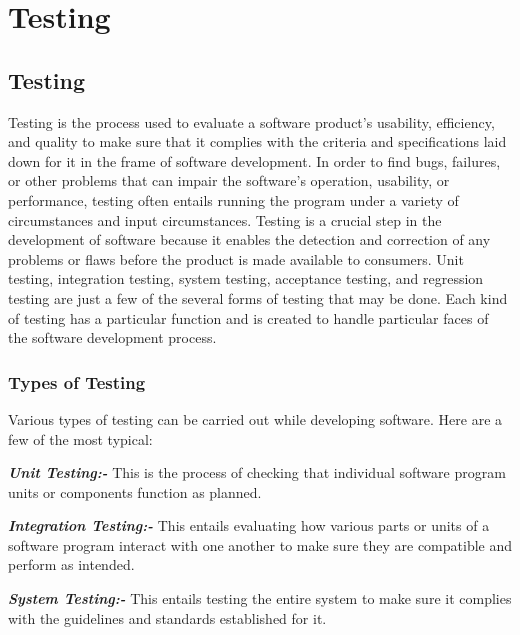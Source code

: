 \chapter{Testing}
\label{C7} %
\section{Testing} \label{S7.1}

Testing is the process used to evaluate a software product's usability, efficiency, and 
quality to make sure that it complies with the criteria and specifications laid down for 
it in the frame of software development. In order to find bugs, failures, or other 
problems that can impair the software's operation, usability, or performance, testing 
often entails running the program under a variety of circumstances and input 
circumstances. Testing is a crucial step in the development of software because it 
enables the detection and correction of any problems or flaws before the product is 
made available to consumers. Unit testing, integration testing, system testing, 
acceptance testing, and regression testing are just a few of the several forms of testing 
that may be done. Each kind of testing has a particular function and is created to handle 
particular faces of the software development process.

\subsection{Types of Testing}

Various types of testing can be carried out while developing software. Here are a few 
of the most typical: 

\textbf{\textit{Unit Testing:-}} This is the process of checking that individual software program units 
or components function as planned.

\textbf{\textit{Integration Testing:-}} This entails evaluating how various parts or units of a software 
program interact with one another to make sure they are compatible and perform as 
intended. 

\textbf{\textit{System Testing:-}} This entails testing the entire system to make sure it complies with 
the guidelines and standards established for it. 

